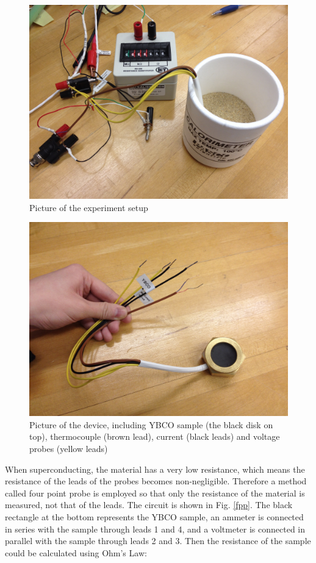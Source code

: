 \documentclass[prb,preprint]{revtex4-1}
\begin{document}
\begin{figure}[h]
\centering
\includegraphics[width=14cm]{ybcosetup.jpg}
\caption{Picture of the experiment setup}
\label{setup}
\end{figure}

\begin{figure}[h]
\centering
\includegraphics[width=14cm]{ybcosample.jpg}
\caption{Picture of the device, including YBCO sample (the black disk on top), thermocouple (brown lead), current (black leads) and voltage probes (yellow leads)}
\label{sample}
\end{figure}

When superconducting, the material has a very low resistance, which means the resistance of the leads of the probes becomes non-negligible. Therefore a method called four point probe is employed so that only the resistance of the material is measured, not that of the leads. The circuit is shown in Fig. \ref{fpp}. The black rectangle at the bottom represents the YBCO sample, an ammeter is connected in series with the sample through leads 1 and 4, and a voltmeter is connected in parallel with the sample through leads 2 and 3. Then the resistance of the sample could be calculated using Ohm's Law:
\end{document}
